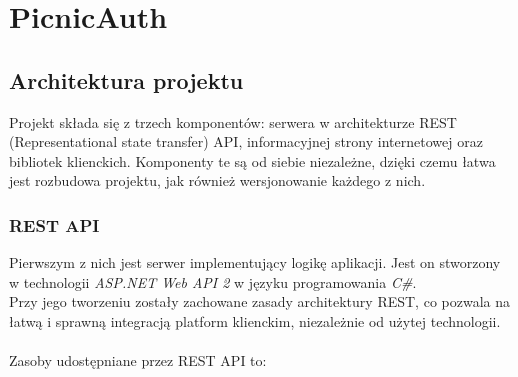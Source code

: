 \chapter{PicnicAuth}

\section{Architektura projektu}
Projekt składa się z trzech komponentów: serwera w architekturze REST (Representational state transfer) API, 
informacyjnej strony internetowej oraz bibliotek klienckich. Komponenty te są od siebie niezależne, dzięki czemu 
łatwa jest rozbudowa projektu, jak również wersjonowanie każdego z nich.

\subsection{REST API}
Pierwszym z nich jest serwer implementujący logikę aplikacji. 
Jest on stworzony w technologii \textit{ASP.NET Web API 2} w języku programowania \textit{C\#}. \\
Przy jego tworzeniu zostały zachowane zasady architektury REST, co pozwala na łatwą i sprawną integracją
platform klienckim, niezależnie od użytej technologii. \\ \\
Zasoby udostępniane przez REST API to:
